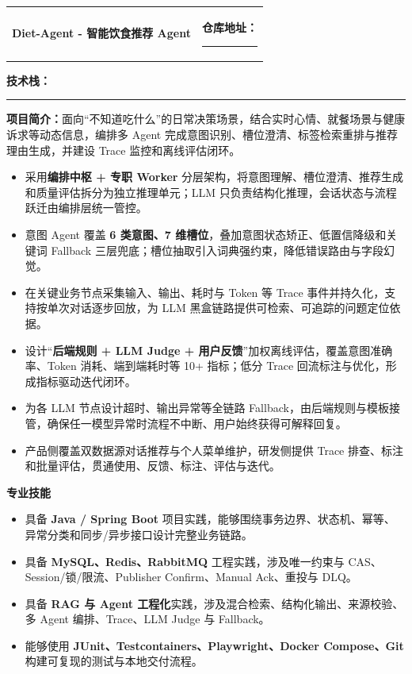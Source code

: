 \documentclass[9.5pt,a4paper,fontset=fandol]{ctexart}
\makeatletter
\newcommand{\blank}[1]{\rule{#1}{0.45pt}}
\newcommand{\sectionbar}[1]{%
  \vspace{3pt}%
  {\color{accent}\bfseries\fontsize{13.5pt}{15pt}\selectfont #1}\par
  \vspace{1.5pt}{\color{accent}\hrule height 0.8pt}\vspace{4pt}%
}
\newcommand{\projecttitle}[2]{%
  \begin{tabularx}{\textwidth}{@{}Xr@{}}
    {\bfseries\fontsize{11.5pt}{13pt}\selectfont #1} & {\bfseries\small #2}
  \end{tabularx}\vspace{1pt}%
}
\newcommand{\labeltext}[1]{\textbf{#1：}}
\newcommand{\tightitem}[1]{\item #1}
\makeatother
\begin{document}
\vspace{2pt}
\projecttitle{Diet-Agent - 智能饮食推荐 Agent}{仓库地址：\blank{4.2cm}}
\labeltext{技术栈}\blank{12.8cm}

\vspace{2pt}
\labeltext{项目简介}面向“不知道吃什么”的日常决策场景，结合实时心情、就餐场景与健康诉求等动态信息，编排多 Agent 完成意图识别、槽位澄清、标签检索重排与推荐理由生成，并建设 Trace 监控和离线评估闭环。
\begin{itemize}
  \tightitem{采用\textbf{编排中枢 + 专职 Worker} 分层架构，将意图理解、槽位澄清、推荐生成和质量评估拆分为独立推理单元；LLM 只负责结构化推理，会话状态与流程跃迁由编排层统一管控。}
  \tightitem{意图 Agent 覆盖 \textbf{6 类意图、7 维槽位}，叠加意图状态矫正、低置信降级和关键词 Fallback 三层兜底；槽位抽取引入词典强约束，降低错误路由与字段幻觉。}
  \tightitem{在关键业务节点采集输入、输出、耗时与 Token 等 Trace 事件并持久化，支持按单次对话逐步回放，为 LLM 黑盒链路提供可检索、可追踪的问题定位依据。}
  \tightitem{设计“\textbf{后端规则 + LLM Judge + 用户反馈}”加权离线评估，覆盖意图准确率、Token 消耗、端到端耗时等 10+ 指标；低分 Trace 回流标注与优化，形成指标驱动迭代闭环。}
  \tightitem{为各 LLM 节点设计超时、输出异常等全链路 Fallback，由后端规则与模板接管，确保任一模型异常时流程不中断、用户始终获得可解释回复。}
  \tightitem{产品侧覆盖双数据源对话推荐与个人菜单维护，研发侧提供 Trace 排查、标注和批量评估，贯通使用、反馈、标注、评估与迭代。}
\end{itemize}

\sectionbar{专业技能}
\begin{itemize}
  \tightitem{具备 \textbf{Java / Spring Boot} 项目实践，能够围绕事务边界、状态机、幂等、异常分类和同步/异步接口设计完整业务链路。}
  \tightitem{具备 \textbf{MySQL、Redis、RabbitMQ} 工程实践，涉及唯一约束与 CAS、Session/锁/限流、Publisher Confirm、Manual Ack、重投与 DLQ。}
  \tightitem{具备 \textbf{RAG 与 Agent 工程化}实践，涉及混合检索、结构化输出、来源校验、多 Agent 编排、Trace、LLM Judge 与 Fallback。}
  \tightitem{能够使用 \textbf{JUnit、Testcontainers、Playwright、Docker Compose、Git} 构建可复现的测试与本地交付流程。}
\end{itemize}
\end{document}
